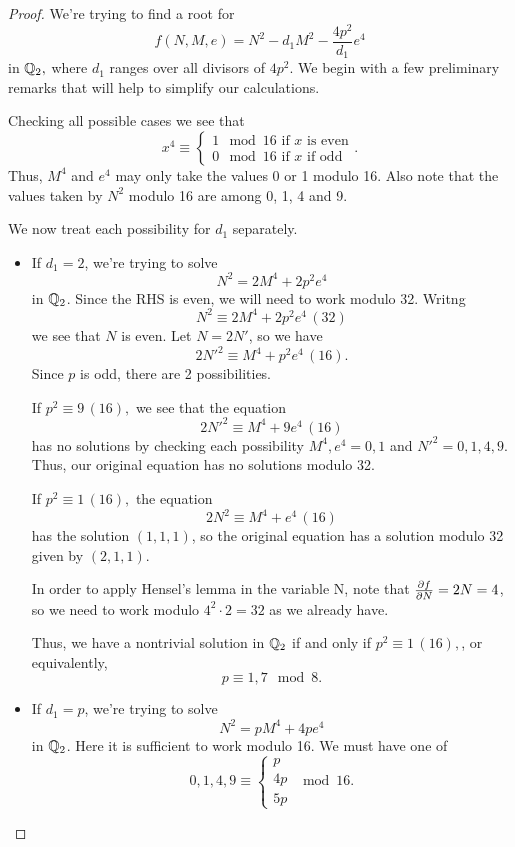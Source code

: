 \documentclass[12pt, a4paper]{amsart}
\begin{document}
\begin{proof}
  We're trying to find a root for
  \[f(N,M,e) = N^2 - d_1M^2 - \frac{4p^2}{d_1}e^4\]
  in ${\mathbb Q}_2,$
  where $d_1$ ranges over all divisors of $4p^2$.
  We begin with a few preliminary remarks that will help to 
  simplify our calculations.
 
  Checking all possible cases we see that
  \[x^4 \equiv
    \begin{cases}
      1 \mod{16} \text{ if } x \text{ is even} \\
      0 \mod{16} \text{ if } x \text{ if odd}
    \end{cases}.
  \]
  Thus, $M^4$ and $e^4$ may only take the values 0 or 1 modulo 16.
  Also note that the values taken by $N^2$ modulo 16 are among 0, 1, 4 and 9.
 
  We now treat each possibility for $d_1$ separately.
  
  \begin{itemize}
  \item If $d_1 = 2$, we're trying to solve
    \[N^2 = 2M^4 + 2p^2e^4 \] in ${\mathbb Q}_2$. 
    Since the RHS is even, we will need
    to work modulo 32. Writng
    \[N^2 \equiv 2M^4 + 2p^2e^4 \, (32)\]
    we see that $N$ is even. Let $N = 2N'$, so we have
    \[2N'^2 \equiv M^4 + p^2e^4 \, (16).\]
    Since $p$ is odd, there are 2 possibilities.

    If $p^2 \equiv 9 \, (16),$ we see that the equation
    \[2N'^2 \equiv M^4 + 9e^4 \, (16)\]
    has no solutions by checking each possibility $M^4, e^4 = 0, 1$ and
    $N'^2 = 0, 1, 4, 9$. Thus, our original equation has no solutions modulo 32.

    If $p^2 \equiv 1 \, (16),$ the equation
    \[2N^2 \equiv M^4 + e^4 \, (16)\]
    has the solution $(1,1,1)$, so the original equation has a solution modulo
    32 given by $(2,1,1).$

    In order to apply Hensel's lemma in the variable N, note that
    $\frac{\partial f}{\partial N} = 2N = 4$, so we need to work modulo $4^2 \cdot 2 = 32$ as
    we already have.

    Thus, we have a nontrivial solution in ${\mathbb Q}_2$ if and only if $p^2 \equiv 1
    \, (16),$, or equivalently,
    \[p \equiv 1, 7 \mod{8}.\]
    
    \item If $d_1 = p$, we're trying to solve
    \[N^2 = pM^4 + 4pe^4 \] in ${\mathbb Q}_2$. Here it is sufficient to work modulo 16.
    We must have one of
    \[0, 1, 4, 9 \equiv
      \begin{cases}
        p \\
        4p \\
        5p
      \end{cases} \mod{16}.
    \]


\end{itemize}
\end{proof}
\end{document}
